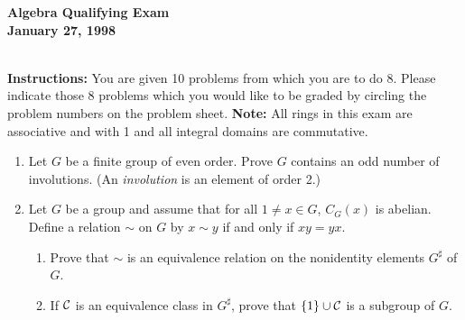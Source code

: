 \documentclass{article}
\begin{document}
\begin{Large}
\newcommand{\C}{{\Bbb C}}
\newcommand{\Q}{{\Bbb Q}}
\newcommand{\Gal}{\mbox{\rm Gal}}
\newcommand{\Aut}{\mbox{\rm Aut}}


\begin{center}\begin{LARGE}
{\bf  Algebra Qualifying Exam}\\ 
{\bf January 27, 1998}\\ \end{LARGE}
\end{center}
\vspace{0.1in}
\noindent\hrulefill\\
{\bf Instructions:} You are given 10 problems from which you are to do 8.
 Please indicate those  8 problems which you would like  to be graded 
by circling the problem numbers on the  problem sheet. 
{\bf Note:} All rings in this exam are associative and with 1 and 
all integral domains are commutative.


\vspace{0.2in}

\begin{enumerate}


\item Let $G$ be a finite group of even order. Prove $G$ contains
an odd number of involutions. (An {\em involution} is an element
of order 2.)

\item Let $G$ be a group and assume that for all $1\not= x\in G$,
$C_G(x)$ is abelian. Define a relation $\sim $ on $G$ by $x\sim y$
if and only if $xy=yx$. 
\begin{enumerate}
\item Prove that $\sim$ is an equivalence relation on the nonidentity
elements $G^\sharp $ of $G$.
\item If $\cal C$ is an equivalence class in $G^\sharp $, prove that
$\{1\}\cup \cal C $ is a subgroup of $G$.
\end{enumerate}


\end{enumerate}
\end{Large}
\end{document}
